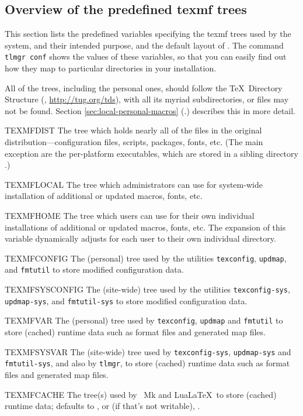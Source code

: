 \documentclass{article}
\begin{document}
\subsection{Overview of the predefined texmf trees}
\label{sec:texmftrees}

This section lists the predefined variables specifying the texmf trees
used by the system, and their intended purpose, and the default layout
of \TL{}. The command \texttt{tlmgr~conf} shows the values of these
variables, so that you can easily find out how they map to particular
directories in your installation.

All of the trees, including the personal ones, should follow the \TeX\
Directory Structure (\TDS, \url{http://tug.org/tds}), with all its
myriad subdirectories, or files may not be found.  Section
\ref{sec:local-personal-macros} (\p.\pageref{sec:local-personal-macros})
describes this in more detail.

\begin{ttdescription}
\item [TEXMFDIST] The tree which holds nearly all of the files in the original
  distribution---configuration files, scripts, packages, fonts, etc.
  (The main exception are the per-platform executables, which are stored
  in a sibling directory \code{bin/}.)
\item [TEXMFLOCAL] The tree which administrators can use for system-wide
  installation of additional or updated macros, fonts, etc.
\item [TEXMFHOME] The tree which users can use for their own individual
  installations of additional or updated macros, fonts, etc.
  The expansion of this variable dynamically adjusts for each user to
  their own individual directory.
\item [TEXMFCONFIG] The (personal) tree used by the utilities
  \verb+texconfig+, \verb+updmap+, and \verb+fmtutil+ to store modified
  configuration data.
\item [TEXMFSYSCONFIG] The (site-wide) tree used by the utilities
  \verb+texconfig-sys+, \verb+updmap-sys+, and \verb+fmtutil-sys+ to
  store modified configuration data.
\item [TEXMFVAR] The (personal) tree used by \verb+texconfig+,
  \verb+updmap+ and \verb+fmtutil+ to store (cached) runtime data such
  as format files and generated map files.
\item [TEXMFSYSVAR] The (site-wide) tree used by \verb+texconfig-sys+,
  \verb+updmap-sys+ and \verb+fmtutil-sys+, and also by \verb+tlmgr+, to
  store (cached) runtime data such as format files and generated map files.
\item [TEXMFCACHE] The tree(s) used by \ConTeXt\ Mk\acro{IV} and Lua\LaTeX\
  to store (cached) runtime data; defaults to ,
  or (if that's not writable), \code{TEXMFVAR}.
\end{ttdescription}
\end{document}
